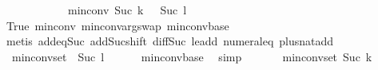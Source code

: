 \begin{isabellebody}
\ \ \ \ \ \ \ \ \ \ \ {\isacharequal}{\kern0pt}\ min{\isacharunderscore}{\kern0pt}conv\ {\isacharparenleft}{\kern0pt}Suc\ {\isacharparenleft}{\kern0pt}k\ {\isacharplus}{\kern0pt}\ {}{\isacharparenright}{\kern0pt}{\isacharparenright}{\kern0pt}\ {\isacharparenleft}{\kern0pt}Suc\ {\isacharparenleft}{\kern0pt}l\ {\isacharplus}{\kern0pt}\ {}{\isacharparenright}{\kern0pt}{\isacharparenright}{\kern0pt}{\isachardoublequoteclose}\ \isanewline
\ \ \ \ \ \ \isamarkupfalse%
\ True\ min{\isacharunderscore}{\kern0pt}conv{\isacharunderscore}{\kern0pt}{}{\isacharparenleft}{\kern0pt}{}{\isacharparenright}{\kern0pt}\ min{\isacharunderscore}{\kern0pt}conv{\isacharunderscore}{\kern0pt}arg{\isacharunderscore}{\kern0pt}swap\ min{\isacharunderscore}{\kern0pt}conv{\isacharunderscore}{\kern0pt}base\ \isanewline
\ \ \ \ \ \ \isamarkupfalse%
\ {\isacharparenleft}{\kern0pt}metis\ add{\isacharunderscore}{\kern0pt}{}{\isacharunderscore}{\kern0pt}eq{\isacharunderscore}{\kern0pt}Suc{\isacharprime}{\kern0pt}\ add{\isacharunderscore}{\kern0pt}Suc{\isacharunderscore}{\kern0pt}shift\ diff{\isacharunderscore}{\kern0pt}Suc{\isacharunderscore}{\kern0pt}{}\ le{\isacharunderscore}{\kern0pt}add{}\ numeral{\isacharunderscore}{\kern0pt}{}{\isacharunderscore}{\kern0pt}eq{\isacharunderscore}{\kern0pt}{}\ plus{\isacharunderscore}{\kern0pt}nat{\isachardot}{\kern0pt}add{\isacharunderscore}{\kern0pt}{}{\isacharparenright}{\kern0pt}\isanewline
\ \ \ \ \isamarkupfalse%
\ {}{\isacharcolon}{\kern0pt}\ {\isachardoublequoteopen}min{\isacharunderscore}{\kern0pt}conv{\isacharunderscore}{\kern0pt}set\ {}\ {\isacharparenleft}{\kern0pt}Suc\ {\isacharparenleft}{\kern0pt}l\ {\isacharplus}{\kern0pt}\ {}{\isacharparenright}{\kern0pt}{\isacharparenright}{\kern0pt}\ {\isasymnoteq}\ {\isacharbraceleft}{\kern0pt}{\isacharbraceright}{\kern0pt}{\isachardoublequoteclose}\ \isamarkupfalse%
\ min{\isacharunderscore}{\kern0pt}conv{\isacharunderscore}{\kern0pt}base\ \isamarkupfalse%
\ simp\isanewline
\ \ \ \ \isamarkupfalse%
\ {}{\isacharcolon}{\kern0pt}\ {\isachardoublequoteopen}min{\isacharunderscore}{\kern0pt}conv{\isacharunderscore}{\kern0pt}set\ {\isacharparenleft}{\kern0pt}Suc\ {\isacharparenleft}{\kern0pt}k\ {\isacharplus}{\kern0pt}\ {}{\isacharparenright}{\kern0pt}{\isacharparenright}{\kern0pt}\ {}\ {\isasymnoteq}\ {\isacharbraceleft}{\kern0pt}{\isacharbraceright}{\kern0pt}{\isachardoublequoteclose}\isanewline

\end{isabellebody}

